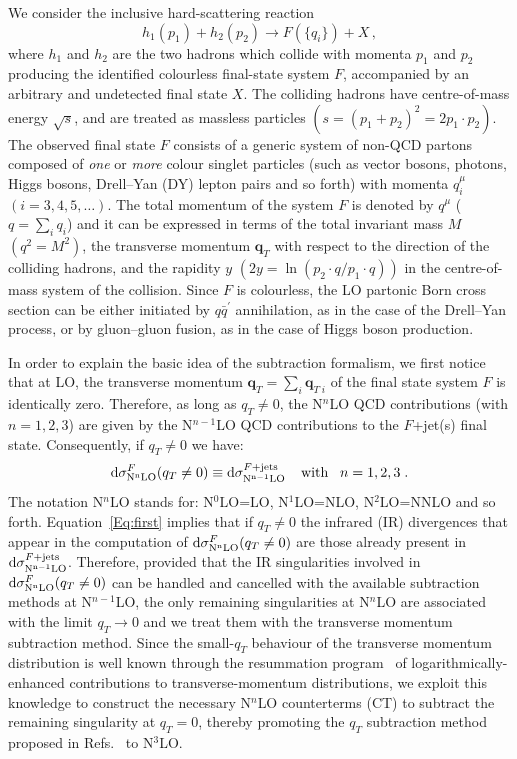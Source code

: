 \documentclass[12pt]{article}
\def\to{\rightarrow}
\DeclareRobustCommand{\qt}{q_T}
\DeclareRobustCommand{\bqt}{\ensuremath{\mathbf{q}_T}}
\DeclareRobustCommand{\rd}{\ensuremath{\mathrm{d}}}
\begin{document}
We consider the inclusive hard-scattering reaction 
\begin{equation}
h_1(p_1)+h_2(p_2)\to F(\{q_i\})+X\, ,
\label{class}
\end{equation}
where $h_1$ and $h_2$ are the two hadrons which collide with momenta $p_1$ and $p_2$ producing the identified colourless final-state system $F$, accompanied by an arbitrary and undetected final state $X$. The colliding hadrons have centre-of-mass energy $\sqrt s$, and are treated as massless particles $(s= (p_1+p_2)^2 = 2p_1\cdot p_2)$. The observed final state $F$ consists of a generic system of non-QCD partons composed of {\em one} or {\em more} colour singlet particles (such as vector bosons, photons, Higgs bosons, Drell--Yan (DY) lepton pairs and so forth) with momenta $q_i^{\mu}$ $(i=3,4,5,\dots)$. The total momentum of the system $F$ is denoted by $q^{\mu}$ ($q=\sum_i q_i$) and it can be expressed in terms of the total invariant mass $M$ $(q^2=M^2)$, the transverse momentum $\bqt$ with respect to the direction of the colliding hadrons, and the rapidity $y$ $(2y = \ln (p_2\cdot q/p_1\cdot q))$ in the centre-of-mass system of the collision. 
Since $F$ is colourless, the LO partonic Born cross section can be either initiated by $q\bar{q}^{\prime}$ annihilation, as in the case of the Drell--Yan process, or by gluon--gluon fusion, as in the case of Higgs boson production.

In order to explain the basic idea  of the subtraction formalism, we first notice that at LO, the transverse momentum $\mathbf{q}_{T}=\sum_i \mathbf{q}_{T\;i}$ of the final state system $F$ is identically zero. Therefore, as long as $\qt \neq 0$, the N$^{n}$LO QCD contributions (with $n=1,2,3$) are given by the N$^{n-1}$LO QCD contributions to the $F$+jet(s) final state. Consequently, if $\qt \neq 0$ we have:
\begin{equation}
\label{Eq:first}
\rd\sigma^{F}_{\rm N^{n}LO}(\qt \neq0) \equiv \rd\sigma^{F+{\rm jets}}_{\rm N^{n-1}LO}\;\;\;\;{\rm with}\;\;\; n=1,2,3\;.
\end{equation}
The notation N$^{n}$LO stands for: N$^{0}$LO=LO, N$^{1}$LO=NLO, N$^{2}$LO=NNLO and so forth. Equation~\eqref{Eq:first} implies that if $\qt \neq 0$ the infrared (IR) divergences that appear in the computation of $\rd\sigma^{F}_{\rm N^{n}LO}(\qt \neq0)$ are those already present in $\rd\sigma^{F+{\rm jets}}_{\rm N^{n-1}LO}$.
Therefore, provided that the IR singularities involved in $\rd\sigma^{F}_{\rm N^{n}LO}(\qt \neq0)$ can be handled and cancelled with the available subtraction methods at N$^{n-1}$LO, the only remaining singularities at  N$^{n}$LO are associated with the limit $\qt \rightarrow 0$ and we treat them with the transverse momentum subtraction method. Since the small-$\qt$ behaviour of the transverse momentum distribution is well known through the resummation program~\cite{qTRes:program} of logarithmically-enhanced contributions to transverse-momentum distributions, we exploit this knowledge to construct the necessary N$^{n}$LO counterterms (CT) to subtract the remaining singularity at $\qt=0$, thereby promoting the $\qt$ subtraction method proposed in Refs.~\cite{Catani:2007vq} to N$^{3}$LO. 
\end{document}
